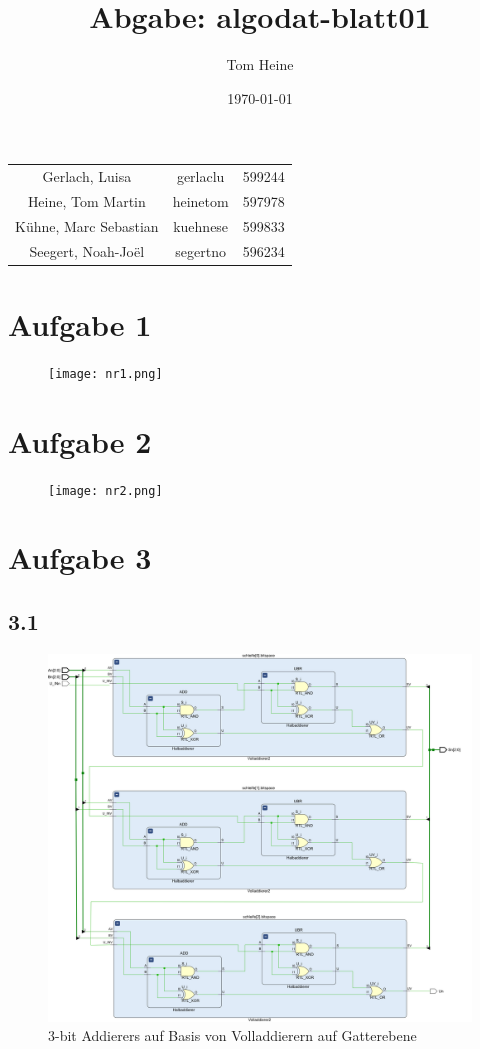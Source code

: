 \documentclass[12pt,a4paper]{scrartcl}
\author{Tom Heine}
\title{Abgabe: algodat-blatt01}
\date{\today}
\begin{document}
	\newpage
	\begin{center}
		\begin{tabular}{ccc}
			Gerlach, Luisa&gerlaclu&599244\\
			Heine, Tom Martin&heinetom&597978\\
			Kühne, Marc Sebastian&kuehnese&599833\\
			Seegert, Noah-Joël&segertno&596234
		\end{tabular}
	\end{center}
	\section*{Aufgabe 1}
		\begin{figure}[ht]
			\begin{center}
				\texttt{[image: nr1.png]}
			\end{center}
		\end{figure}
	\newpage
	\section*{Aufgabe 2}
	\begin{figure}[ht]
		\begin{center}
			\texttt{[image: nr2.png]}
		\end{center}
	\end{figure}
\newpage
	\section*{Aufgabe 3}
	\subsection*{3.1}
		\begin{figure}[ht]
			\begin{center}
				\includegraphics[width=\linewidth]{3bitaddierer.png}
				\caption{3-bit Addierers auf Basis von Volladdierern auf Gatterebene}
			\end{center}
		\end{figure}
\end{document}
